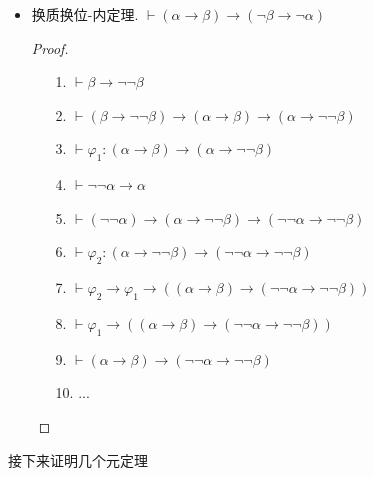 \documentclass[main.tex]{subfiles}
\begin{document}
\begin{itemize}
    \item 换质换位-内定理. \(\vdash (\alpha \to \beta) \to (\neg \beta \to \neg \alpha)\)
    \begin{proof}
        \begin{itemize}
            \item [1.] \(\vdash \beta \to \neg \neg \beta\)
            \item [2.] \(\vdash (\beta \to \neg \neg \beta) \to (\alpha \to \beta) \to (\alpha \to \neg \neg \beta)\)
            \item [3.] \(\vdash \varphi_1: (\alpha \to \beta) \to (\alpha \to \neg \neg \beta)\)
            \item [4.] \(\vdash \neg \neg \alpha \to \alpha\)
            \item [5.] \(\vdash (\neg \neg \alpha) \to (\alpha \to \neg \neg \beta) \to (\neg \neg \alpha \to \neg \neg \beta)\)
            \item [6.] \(\vdash \varphi_2: (\alpha \to \neg \neg \beta) \to (\neg \neg \alpha \to \neg \neg \beta)\)
            \item [7.] \(\vdash \varphi_2 \to \varphi_1 \to ((\alpha \to \beta) \to (\neg \neg \alpha \to \neg \neg \beta))\)
            \item [8.] \(\vdash \varphi_1 \to ((\alpha \to \beta) \to (\neg \neg \alpha \to \neg \neg \beta))\)
            \item [9.] \(\vdash (\alpha \to \beta) \to (\neg \neg \alpha \to \neg \neg \beta)\)
            \item [10.] ...
        \end{itemize}
    \end{proof}
    
\end{itemize}

接下来证明几个元定理
\end{document}
